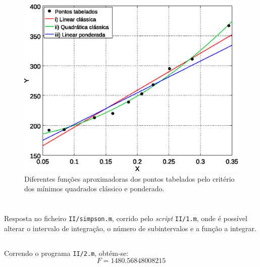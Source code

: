 \documentclass[portuguese, a4paper]{article}
\begin{document}
	\begin{figure}[H]
		\centering
		\includegraphics[width=0.80\linewidth]{I_fino}
		\captionsetup{width=0.80\linewidth}
		\caption{Diferentes funções aproximadoras dos pontos tabelados pelo critério dos mínimos quadrados clássico e ponderado.}
	\end{figure}

\newpage

\section{} \label{sec:II}
	\subsection{} \label{sec:II.1}
	\par
	Resposta no ficheiro \texttt{II/simpson.m}, corrido pelo \emph{script} \texttt{II/1.m}, onde é possível alterar o intervalo de integração, o número de subintervalos e a função a integrar.

	\subsection{} \label{sec:II.2}
	\subsubsection{} \label{sec:II.2a)}
	\par
	Correndo o programa \texttt{II/2.m}, obtém-se:
	$$F =  1480.56848008215$$
\end{document}
